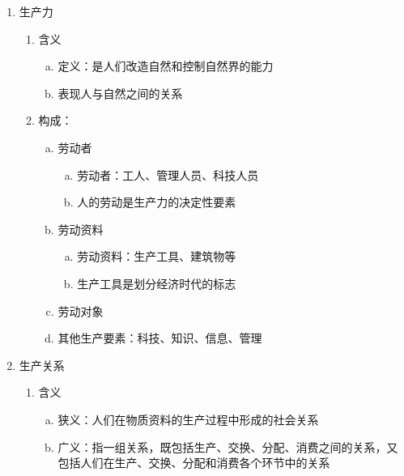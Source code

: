 \documentclass[12pt]{book}
\begin{document}
\begin{enumerate}[1.]
    \item 生产力
          \begin{enumerate}[(1)]
            \item 含义
                  \begin{enumerate}[a.]
                    \item 定义：是人们改造自然和控制自然界的能力
                    \item 表现人与自然之间的关系
                  \end{enumerate}
            \item 构成：
                  \begin{enumerate}[a.]
                    \item 劳动者
                          \begin{enumerate}[(a)]
                            \item 劳动者：工人、管理人员、科技人员
                            \item 人的劳动是生产力的决定性要素
                          \end{enumerate}
                    \item 劳动资料
                          \begin{enumerate}[(a)]
                            \item 劳动资料：生产工具、建筑物等
                            \item 生产工具是划分经济时代的标志
                          \end{enumerate}
                    \item 劳动对象
                    \item 其他生产要素：科技、知识、信息、管理
                  \end{enumerate}
          \end{enumerate}
    \item 生产关系
          \begin{enumerate}[(1)]
            \item 含义
                  \begin{enumerate}[a.]
                    \item 狭义：人们在物质资料的生产过程中形成的社会关系
                    \item 广义：指一组关系，既包括生产、交换、分配、消费之间的关系，又包括人们在生产、交换、分配和消费各个环节中的关系
                          \begin{enumerate}[(a)]

\end{enumerate}
\end{enumerate}
\end{enumerate}
\end{enumerate}
\end{document}
